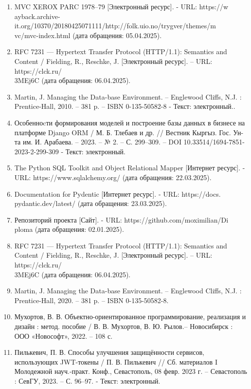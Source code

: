 \documentclass[a4paper,14pt,oneside]{extreport}
\begin{document}
\begin{enumerate}
    \item MVC XEROX PARC 1978–79 [Электронный ресурс]. - URL: https://w\\ayback.archive-it.org/10370/20180425071111/http://folk.uio.no/trygver/themes/m\\vc/mvc-index.html (дата обращения: 05.04.2025).
    \item RFC 7231 — Hypertext Transfer Protocol (HTTP/1.1): Semantics and Content / Fielding, R., Reschke, J. [Электронный ресурс]. – URL: https://clck.ru/\\3MEj6C (дата обращения: 06.04.2025).
    \item Martin, J. Managing the Data-base Environment. – Englewood Cliffs, N.J. : Prentice-Hall, 2010. – 381 p. – ISBN 0-135-50582-8 - Текст: электронный..
    \item Особенноcти формирования моделей и построение базы данных в бизнесе на платформе Django ORM / М. Б. Тлебаев и др. // Вестник Кыргыз. Гос. Ун-та им. И. Арабаева. – 2023. – № 2. – С. 299–309. – DOI 10.33514/1694-7851-2023-2-299-309 - Текст: электронный.
    \item  The Python SQL Toolkit and Object Relational Mapper [Интернет ресурс]. - URL: https://www.sqlalchemy.org/ (дата обращения: 22.03.2025).
    \item  Documentation for Pydentic [Интернет ресурс]. - URL: https://docs.\\pydantic.dev/latest/ (дата обращения: 23.03.2025).
    \item  Репозиторий проекта [Сайт]. - URL: https://github.com/moximilian/Di\\ploma (дата обращения: 02.01.2025).
    \item RFC 7231 — Hypertext Transfer Protocol (HTTP/1.1): Semantics and Content / Fielding, R., Reschke, J. [Электронный ресурс]. – URL: https://clck.ru/\\3MEj6C (дата обращения: 06.04.2025).
    \item Martin, J. Managing the Data-base Environment. – Englewood Cliffs, N.J. : Prentice-Hall, 2020. – 381 p. – ISBN 0-135-50582-8.
    \item Мухортов, В. В. Объектно-ориентированное программирование, реализация и дизайн : метод. пособие / В. В. Мухортов, В. Ю. Рылов.– Новосибирск : ООО «Новософт», 2022. – 108 с.
    \item Пилькевич, П. В. Способы улучшения защищённости сервисов, использующих JWT-токены / П. В. Пилькевич // Сб. материалов I Молодежной науч.-практ. Конф., Севастополь, 08 февр. 2023 г. – Севастополь : СевГУ, 2023. – С. 96–97.  - Текст: электронный.

\end{enumerate}
\end{document}
